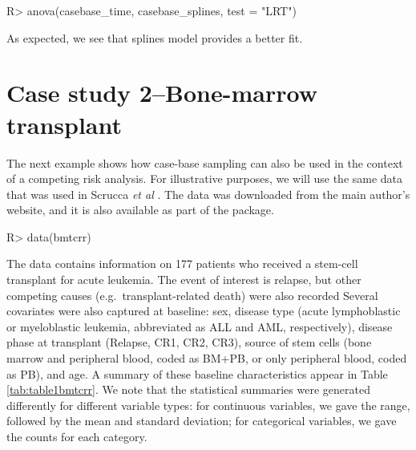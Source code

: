 \documentclass[
]{jss}
\begin{document}
\begin{CodeChunk}

\begin{CodeInput}
R> anova(casebase_time, casebase_splines, test = "LRT")
\end{CodeInput}
\end{CodeChunk}

As expected, we see that splines model provides a better fit.

\hypertarget{case-study-2bone-marrow-transplant}{%
\section{Case study 2--Bone-marrow
transplant}\label{case-study-2bone-marrow-transplant}}

The next example shows how case-base sampling can also be used in the
context of a competing risk analysis. For illustrative purposes, we will
use the same data that was used in Scrucca \emph{et al}
\citeyearpar{scrucca2010regression}. The data was downloaded from the
main author's website, and it is also available as part of the
 package.

\begin{CodeChunk}

\begin{CodeInput}
R> data(bmtcrr)
\end{CodeInput}
\end{CodeChunk}

The data contains information on 177 patients who received a stem-cell
transplant for acute leukemia. The event of interest is relapse, but
other competing causes (e.g.~transplant-related death) were also
recorded Several covariates were also captured at baseline: sex, disease
type (acute lymphoblastic or myeloblastic leukemia, abbreviated as ALL
and AML, respectively), disease phase at transplant (Relapse, CR1, CR2,
CR3), source of stem cells (bone marrow and peripheral blood, coded as
BM+PB, or only peripheral blood, coded as PB), and age. A summary of
these baseline characteristics appear in Table \ref{tab:table1bmtcrr}.
We note that the statistical summaries were generated differently for
different variable types: for continuous variables, we gave the range,
followed by the mean and standard deviation; for categorical variables,
we gave the counts for each category.
\end{document}

